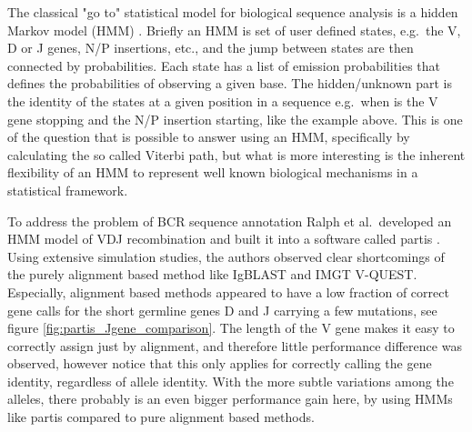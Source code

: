 The classical "go to" statistical model for biological sequence analysis is a hidden Markov model (HMM) \cite{durbin1998biological}.
Briefly an HMM is set of user defined states, e.g.\ the V, D or J genes, N/P insertions, etc., and the jump between states are then connected by probabilities.
Each state has a list of emission probabilities that defines the probabilities of observing a given base.
The hidden/unknown part is the identity of the states at a given position in a sequence e.g.\ when is the V gene stopping and the N/P insertion starting, like the example above.
This is one of the question that is possible to answer using an HMM, specifically by calculating the so called Viterbi path, but what is more interesting is the inherent flexibility of an HMM to represent well known biological mechanisms in a statistical framework.

To address the problem of BCR sequence annotation Ralph et al.\ developed an HMM model of VDJ recombination and built it into a software called partis \cite{ralph2016consistency}.
Using extensive simulation studies, the authors observed clear shortcomings of the purely alignment based method like IgBLAST and IMGT V-QUEST.
Especially, alignment based methods appeared to have a low fraction of correct gene calls for the short germline genes D and J carrying a few mutations, see figure \ref{fig:partis_Jgene_comparison}.
The length of the V gene makes it easy to correctly assign just by alignment, and therefore little performance difference was observed, however notice that this only applies for correctly calling the gene identity, regardless of allele identity.
With the more subtle variations among the alleles, there probably is an even bigger performance gain here, by using HMMs like partis compared to pure alignment based methods.

